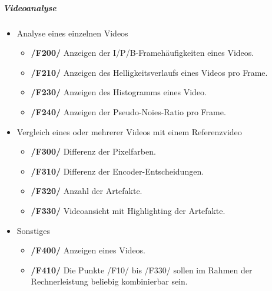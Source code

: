 \subparagraph{Videoanalyse}
\begin{itemize}
	\item Analyse eines einzelnen Videos  
		\begin{itemize}
			\item \textbf{/F200/} Anzeigen der I/P/B-Framehäufigkeiten eines Videos.
			\item \textbf{/F210/} Anzeigen des Helligkeitsverlaufs eines Videos pro Frame.
			\item \textbf{/F230/} Anzeigen des Histogramms eines Video.
			\item \textbf{/F240/} Anzeigen der Pseudo-Noies-Ratio pro Frame.
		   \end{itemize} 
	\item Vergleich eines oder mehrerer Videos mit einem Referenzvideo
		\begin{itemize}
			\item \textbf{/F300/} Differenz der Pixelfarben.
			\item \textbf{/F310/} Differenz der Encoder-Entscheidungen.
			\item \textbf{/F320/} Anzahl der Artefakte.
			\item \textbf{/F330/} Videoansicht mit Highlighting der Artefakte.
		\end{itemize}	
	\item Sonstiges
		\begin{itemize}
			\item \textbf{/F400/} Anzeigen eines Videos. 
			\item \textbf{/F410/} Die Punkte /F10/ bis /F330/ sollen im Rahmen der Rechnerleistung beliebig kombinierbar sein.
		\end{itemize}
\end{itemize}

